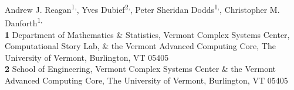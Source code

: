Andrew J. Reagan\textsuperscript{1,\Yinyang},
Yves Dubief\textsuperscript{2,\Yinyang},
Peter Sheridan Dodds\textsuperscript{1,\Yinyang},
Christopher M. Danforth\textsuperscript{1,\Yinyang}
\\
\bigskip
\textbf{1} Department of Mathematics \& Statistics, Vermont Complex Systems Center, Computational Story Lab, \& the Vermont Advanced Computing Core, The University of Vermont, Burlington, VT 05405
\\
\textbf{2} School of Engineering, Vermont Complex Systems Center \& the Vermont Advanced Computing Core, The University of Vermont, Burlington, VT 05405
\\



